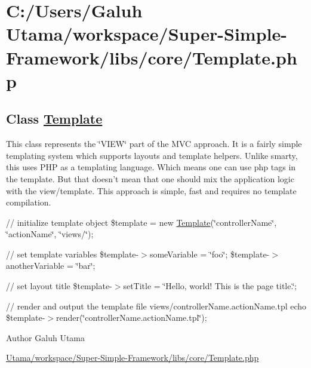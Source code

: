 \hypertarget{_c_1_2_users_2_galuh_01_utama_2workspace_2_super-_simple-_framework_2libs_2core_2_template_8php-example}{\section{\-C\-:/\-Users/\-Galuh Utama/workspace/\-Super-\/\-Simple-\/\-Framework/libs/core/\-Template.\-php}
}
\subsection*{\-Class \hyperlink{class_template}{\-Template}}

\-This class represents the \char`\"{}\-V\-I\-E\-W\char`\"{} part of the \-M\-V\-C approach. \-It is a fairly simple templating system which supports layouts and template helpers. \-Unlike smarty, this uses \-P\-H\-P as a templating language. \-Which means one can use php tags in the template. \-But that doesn't mean that one should mix the application logic with the view/template. \-This approach is simple, fast and requires no template compilation. 

{\ttfamily  // initialize template object \$template = new \hyperlink{class_template}{\-Template}(\char`\"{}controller\-Name\char`\"{}, \char`\"{}action\-Name\char`\"{}, \char`\"{}views/\char`\"{});}

{\ttfamily  // set template variables \$template-\/$>$some\-Variable = \char`\"{}foo\char`\"{}; \$template-\/$>$another\-Variable = \char`\"{}bar\char`\"{};}

{\ttfamily  // set layout title \$template-\/$>$set\-Title = \char`\"{}\-Hello, world! This is the page title.\char`\"{};}

{\ttfamily  // render and output the template file views/controller\-Name.\-action\-Name.\-tpl echo \$template-\/$>$render(\char`\"{}controller\-Name.\-action\-Name.\-tpl\char`\"{}); }

\begin{DoxyAuthor}{\-Author}
\-Galuh \-Utama
\end{DoxyAuthor}

\begin{DoxyCodeInclude}
\end{DoxyCodeInclude}
 \hyperlink{_template_8php_source}{\-Utama/workspace/\-Super-\/\-Simple-\/\-Framework/libs/core/\-Template.\-php} 